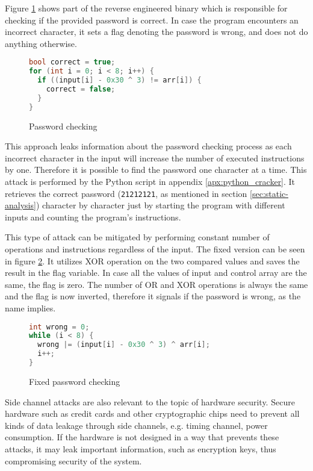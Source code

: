 \documentclass[conference]{IEEEtran}
\begin{document}
Figure \ref{fig:pw_check} shows part of the reverse engineered binary which is responsible for checking if the provided password is correct. In case the program encounters an incorrect character, it sets a flag denoting the password is wrong, and does not do anything otherwise.

\begin{figure}[ht!]
    \begin{lstlisting}[language=c]
bool correct = true;
for (int i = 0; i < 8; i++) {
  if ((input[i] - 0x30 ^ 3) != arr[i]) {
    correct = false;
  }
}
    \end{lstlisting}
    \caption{Password checking}
    \label{fig:pw_check}
\end{figure}

This approach leaks information about the password checking process as each incorrect character in the input will increase the number of executed instructions by one. Therefore it is possible to find the password one character at a time. This attack is performed by the Python script in appendix \ref{apx:python_cracker}. It retrieves the correct password (\texttt{21212121}, as mentioned in section \ref{sec:static-analysis}) character by character just by starting the program with different inputs and counting the program's instructions.

This type of attack can be mitigated by performing constant number of operations and instructions regardless of the input. The fixed version can be seen in figure \ref{fig:pw_check_fixed}. It utilizes XOR operation on the two compared values and saves the result in the flag variable. In case all the values of input and control array are the same, the flag is zero. The number of OR and XOR operations is always the same and the flag is now inverted, therefore it signals if the password is wrong, as the name implies.

\begin{figure}[ht!]
    \begin{lstlisting}[language=c]
int wrong = 0;
while (i < 8) {
  wrong |= (input[i] - 0x30 ^ 3) ^ arr[i];
  i++;
}
    \end{lstlisting}
    \caption{Fixed password checking}
    \label{fig:pw_check_fixed}
\end{figure}

Side channel attacks are also relevant to the topic of hardware security. Secure hardware such as credit cards and other cryptographic chips need to prevent all kinds of data leakage through side channels, e.g. timing channel, power consumption. If the hardware is not designed in a way that prevents these attacks, it may leak important information, such as encryption keys, thus compromising security of the system.
\end{document}
